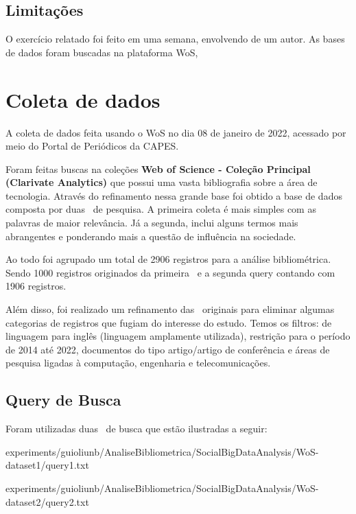 \subsection{Limitações} O exercício relatado foi feito em uma semana, envolvendo de um autor. As bases de dados foram buscadas na plataforma WoS,


\section{Coleta de dados\label{MASSA:coleta}}

A coleta de dados feita usando o WoS no dia 08 de janeiro de 2022, acessado por meio do Portal de Periódicos da CAPES.

Foram feitas buscas na coleções \textbf{Web of Science - Coleção Principal (Clarivate Analytics) } que possui uma vasta bibliografia sobre a área de tecnologia. Através do refinamento nessa grande base foi obtido a base de dados composta por duas \query\ de pesquisa. A primeira coleta é mais simples com as palavras de maior relevância. Já a segunda, inclui alguns termos mais abrangentes e ponderando mais a questão de influência na sociedade. 

Ao todo foi agrupado um total de 2906 registros para a análise bibliométrica. Sendo 1000 registros originados da primeira \query\ e a segunda query contando com 1906 registros.

Além disso, foi realizado um refinamento das \query\ originais para eliminar algumas categorias de registros que fugiam do interesse do estudo. Temos os filtros: de linguagem para inglês (linguagem amplamente utilizada), restrição para o período de 2014 até 2022, documentos do tipo artigo/artigo de conferência e áreas de pesquisa ligadas à computação, engenharia e telecomunicações.

\subsection{Query de Busca}

Foram utilizadas duas \query\ de busca que estão ilustradas a seguir: %


{experiments/guioliunb/AnaliseBibliometrica/SocialBigDataAnalysis/WoS-dataset1/query1.txt}


{experiments/guioliunb/AnaliseBibliometrica/SocialBigDataAnalysis/WoS-dataset2/query2.txt}

